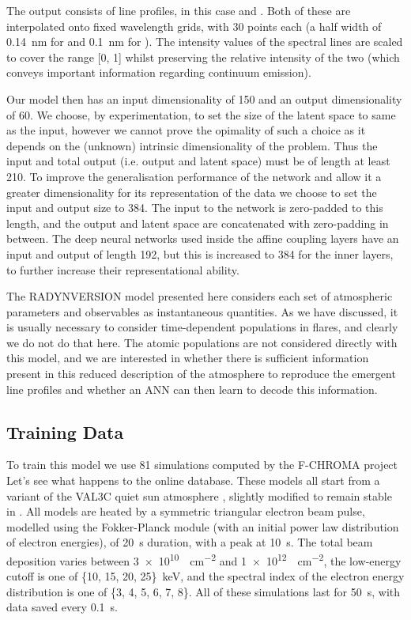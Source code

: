 The output consists of line profiles, in this case \Ha{} and \CaLine{}.
Both of these are interpolated onto fixed wavelength grids, with 30 points each (a half width of \SI{0.14}{\nano\metre} for \Ha{} and \SI{0.1}{\nano\metre} for \CaLine{}).
The intensity values of the spectral lines are scaled to cover the range [0, 1] whilst preserving the relative intensity of the two (which conveys important information regarding continuum emission).

Our model then has an input dimensionality of 150 and an output dimensionality of 60.
We choose, by experimentation, to set the size of the latent space to same as the input, however we cannot prove the opimality of such a choice as it depends on the (unknown) intrinsic dimensionality of the problem.
Thus the input and total output (i.e. output and latent space) must be of length at least 210.
To improve the generalisation performance of the network and allow it a greater dimensionality for its representation of the data we choose to set the input and output size to 384.
The input to the network is zero-padded to this length, and the output and latent space are concatenated with zero-padding in between.
The deep neural networks used inside the affine coupling layers have an input and output of length 192, but this is increased to 384 for the inner layers, to further increase their representational ability.

The RADYNVERSION model presented here considers each set of atmospheric parameters and observables as instantaneous quantities.
As we have discussed, it is usually necessary to consider time-dependent populations in flares, and clearly we do not do that here.
The atomic populations are not considered directly with this model, and we are interested in whether there is sufficient information present in this reduced description of the atmosphere to reproduce the emergent line profiles and whether an ANN can then learn to decode this information.

\subsection{Training Data}

To train this model we use 81 \Radyn{} simulations computed by the F-CHROMA project \NeedRef{} {\color{Red} Let's see what happens to the online database}.
These models all start from a variant of the VAL3C quiet sun atmosphere \citep{Vernazza1981}, slightly modified to remain stable in \Radyn{}.
All models are heated by a symmetric triangular electron beam pulse, modelled using the Fokker-Planck module (with an initial power law distribution of electron energies), of \SI{20}{\s} duration, with a peak at \SI{10}{\s}.
The total beam deposition varies between \SI{3e10}{\erg\per\square\cm} and \SI{1e12}{\erg\per\square\cm}, the low-energy cutoff is one of \{10, 15, 20, 25\}~\si{\kilo\electronvolt}, and the spectral index of the electron energy distribution is one of \{3, 4, 5, 6, 7, 8\}.
All of these simulations last for \SI{50}{\s}, with data saved every \SI{0.1}{\s}.

